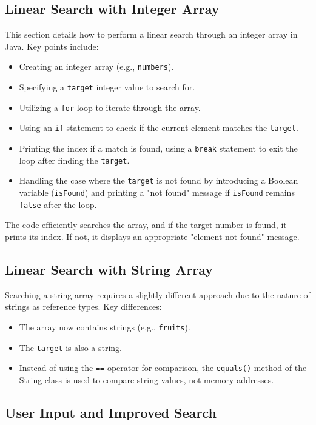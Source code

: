 \documentclass{article}
\begin{document}
\subsection{Linear Search with Integer Array}

This section details how to perform a linear search through an integer array in Java.  Key points include:

\begin{itemize}
\item Creating an integer array (e.g., \texttt{numbers}).
\item Specifying a \texttt{target} integer value to search for.
\item Utilizing a \texttt{for} loop to iterate through the array.
\item Using an \texttt{if} statement to check if the current element matches the \texttt{target}.
\item Printing the index if a match is found, using a \texttt{break} statement to exit the loop after finding the \texttt{target}.
\item Handling the case where the \texttt{target} is not found by introducing a Boolean variable (\texttt{isFound}) and printing a "not found" message if \texttt{isFound} remains \texttt{false} after the loop.
\end{itemize}

The code efficiently searches the array, and if the target number is found, it prints its index. If not, it displays an appropriate "element not found" message.


\subsection{Linear Search with String Array}

Searching a string array requires a slightly different approach due to the nature of strings as reference types. Key differences:

\begin{itemize}
\item The array now contains strings (e.g., \texttt{fruits}).
\item The \texttt{target} is also a string.
\item Instead of using the \texttt{==} operator for comparison, the \texttt{equals()} method of the String class is used to compare string values, not memory addresses.
\end{itemize}


\subsection{User Input and Improved Search}
\end{document}
